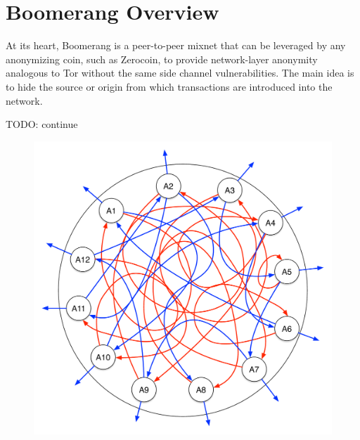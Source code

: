 \section{Boomerang Overview}
At its heart, Boomerang is a peer-to-peer mixnet that can be leveraged by any anonymizing coin, such as Zerocoin, to provide network-layer anonymity analogous to Tor without the same side channel vulnerabilities. The main idea is to hide the source or origin from which transactions are introduced into the network. 

TODO: continue

\begin{figure}[ht!]
\begin{center}
\includegraphics[scale=0.25]{./images/boomerang_net.pdf}
\end{center}
\end{figure}

